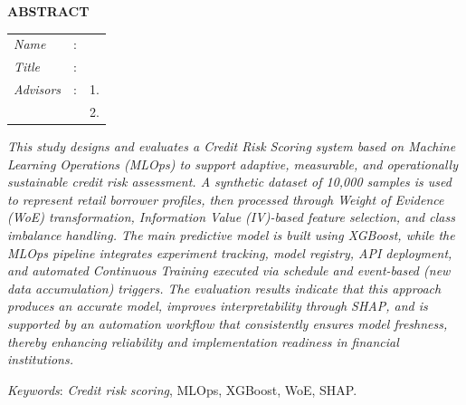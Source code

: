 \begin{center}
  \large\textbf{ABSTRACT}
\end{center}


\vspace{2ex}

\begingroup
\setlength{\tabcolsep}{0pt}

\noindent
\begin{tabularx}{\textwidth}{l >{\centering}m{3em} X}
  \emph{Name}     & : & \name{}         \\

  \emph{Title}    & : & \engtatitle{}   \\

  \emph{Advisors} & : & 1. \advisor{}   \\
                  &   & 2. \coadvisor{} \\
\end{tabularx}
\endgroup

\emph{
  This study designs and evaluates a \textit{Credit Risk Scoring} system based on \textit{Machine Learning Operations} (MLOps) to support adaptive, measurable, and operationally sustainable credit risk assessment. A synthetic dataset of 10,000 samples is used to represent retail borrower profiles, then processed through \textit{Weight of Evidence} (WoE) transformation, \textit{Information Value} (IV)-based feature selection, and class imbalance handling. The main predictive model is built using XGBoost, while the MLOps pipeline integrates experiment tracking, model registry, API deployment, and automated \textit{Continuous Training} executed via schedule and event-based (new data accumulation) triggers. The evaluation results indicate that this approach produces an accurate model, improves interpretability through SHAP, and is supported by an automation workflow that consistently ensures model freshness, thereby enhancing reliability and implementation readiness in financial institutions.}

\emph{Keywords}: \emph{Credit risk scoring}, MLOps, XGBoost, WoE, SHAP.
